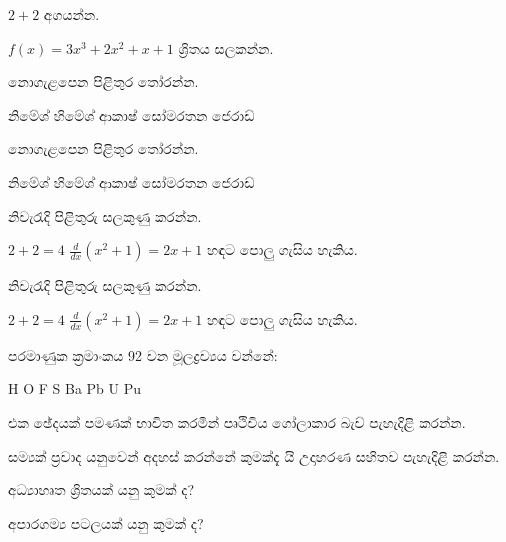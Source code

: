 \documentclass[12pt]{exam}
\begin{document}
\begin{questions}

\question[1] $2+2$ අගයන්න.
\addpoints

\question[20] $f(x)=3x^3+2x^2+x+1$ ශ්‍රිතය සලකන්න.
\noaddpoints %
\addpoints

\question[2] නොගැළපෙන පිළිතුර තෝරන්න.
\begin{choices}
\choice නිමේශ්
\choice හිමේශ්
\choice ආකාෂ්
\choice සෝමරතන
\choice ජෙරාඩ්
\end{choices}

\question[2] නොගැළපෙන පිළිතුර තෝරන්න.
\begin{oneparchoices}
\choice නිමේශ්
\choice හිමේශ්
\choice ආකාෂ්
\choice සෝමරතන
\choice ජෙරාඩ්
\end{oneparchoices}

\question[3] නිවැරැදි පිළිතුරු සලකුණු කරන්න.
\addpoints
\begin{checkboxes}
\choice $2+2=4$
\choice $\frac{d}{dx} (x^2+1) = 2x+1$
\choice හඳට පොලු ගැසිය හැකිය.
\end{checkboxes}

{%
\checkboxchar{$\Box$} %
\question[3] නිවැරැදි පිළිතුරු සලකුණු කරන්න.
\addpoints
\begin{checkboxes}
\choice $2+2=4$
\choice $\frac{d}{dx} (x^2+1) = 2x+1$
\choice හඳට පොලු ගැසිය හැකිය.
\end{checkboxes}
}%

{%
\renewcommand*\thechoice{\arabic{choice}} 
\renewcommand*\choicelabel{\thechoice)}
%
\question[2] පරමාණුක ක්‍රමාංකය 92 වන මූලද්‍රව්‍යය වන්නේ:
\begin{multicols}{2}
\begin{choices}
\choice H
\choice O
\choice F
\choice S
\choice Ba
\choice Pb
\choice U
\choice Pu
\end{choices}
\end{multicols}
}%

\question[10]
එක ඡේදයක් පමණක් භාවිත කරමින් පෘථිවිය ගෝලාකාර බැව් පැහැදිළි කරන්න.
\makeemptybox{2in}

\question[20]
සම්‍යක් ප්‍රවාද යනුවෙන් අදහස් කරන්නේ කුමක්දැ යි උදාහරණ සහිතව පැහැදිළි කරන්න.
\makeemptybox{\fill}

\newpage

\question[20]
අධ්‍යාහෘත ශ්‍රිතයක් යනු කුමක් ද?
\fillwithlines{\fill}

\newpage

\question[20]
අපාරගම්‍ය පටලයක් යනු කුමක් ද?
\fillwithdottedlines{8em}

\end{questions}
\end{document}

